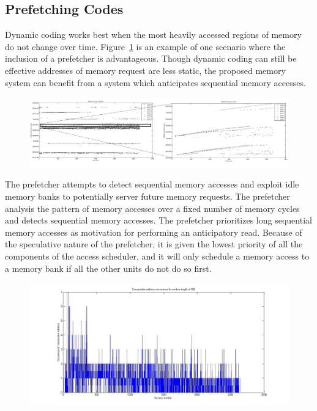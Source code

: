 \subsection{Prefetching Codes}
\label{sec:prefetching}
Dynamic coding works best when the most heavily accessed regions of memory do not change over time. Figure~\ref{fig:bank_access1} is an example of one scenario where the inclusion of a prefetcher is advantageous. Though dynamic coding can still be effective addresses of memory request are less static, the proposed memory system can benefit from a system which anticipates sequential memory accesses. 
\begin{figure}[htbp]
\centering
\includegraphics[width=0.5\linewidth]{fig/bank_access1.jpg}
\caption{ }
\label{fig:bank_access1}
\end{figure} 

The prefetcher attempts to detect sequential memory accesses and exploit idle memory banks to potentially server future memory requests. The prefetcher analysis the pattern of memory accesses over a fixed number of memory cycles and detects sequential memory accesses. The prefetcher prioritizes long sequential memory accesses as motivation for performing an anticipatory read. Because of the speculative nature of the prefetcher, it is given the lowest priority of all the components of the access scheduler, and it will only schedule a memory access to a memory bank if all the other units do not do so first. 


\begin{figure}[htbp]
\centering
\includegraphics[width=\linewidth]{fig/queue_lookahead.jpg}
\caption{ }
\label{fig:queue_lookahead}
\end{figure} 
 
